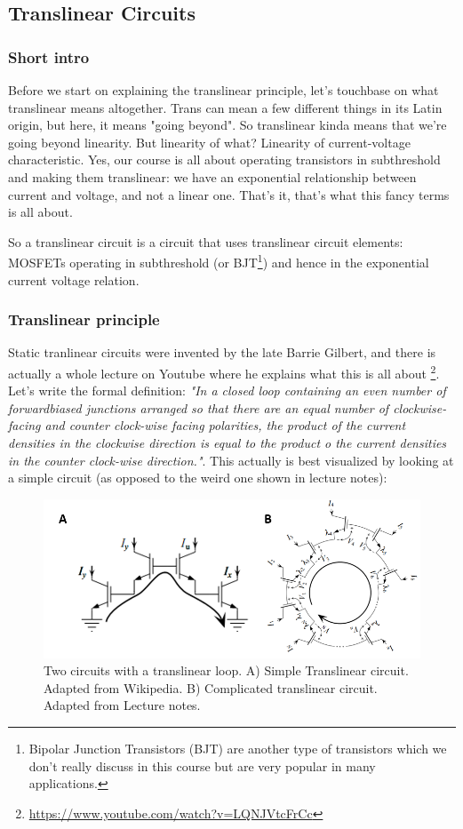 \subsection{Translinear Circuits}

\subsubsection{Short intro}

Before we start on explaining the translinear principle, let's touchbase on what translinear means altogether. Trans can mean a few different things in its Latin origin, but here, it means "going beyond". So translinear kinda means that we're going beyond linearity. But linearity of what? Linearity of current-voltage characteristic. Yes, our course is all about operating transistors in subthreshold and making them translinear: we have an exponential relationship between current and voltage, and not a linear one. That's it, that's what this fancy terms is all about. 

So a translinear circuit is a circuit that uses translinear circuit elements: MOSFETs operating in subthreshold (or BJT\footnote{Bipolar Junction Transistors (BJT) are another type of transistors which we don't really discuss in this course but are very popular in many applications.}) and hence in the exponential current voltage relation. 

\subsubsection{Translinear principle}

Static tranlinear circuits were invented by the late Barrie Gilbert, and there is actually a whole lecture on Youtube where he explains what this is all about \footnote{\url{https://www.youtube.com/watch?v=LQNJVtcFrCc}}. Let's write the formal definition: \textit{"In a closed loop containing an even number of forwardbiased junctions arranged so that there are an equal number of clockwise-facing and counter clock-wise facing polarities, the product of the current densities in the clockwise direction is equal to the product o the current densities in the counter clock-wise direction."}. This actually is best visualized by looking at a simple circuit (as opposed to the weird one shown in lecture notes):


\begin{figure}[H]
    \centering
    \includegraphics[width=0.8\linewidth]{../../Figures/Translinear_Principle.PNG}
    \caption{Two circuits with a translinear loop. A) Simple Translinear circuit. Adapted from Wikipedia. B) Complicated translinear circuit. Adapted from Lecture notes.}
    \label{fig:Translinear Principle}
\end{figure}

